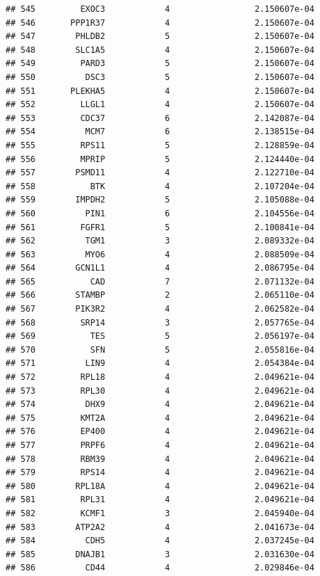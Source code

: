 \documentclass[
]{article}
\begin{document}
\begin{verbatim}
## 545         EXOC3            4                 2.150607e-04
## 546       PPP1R37            4                 2.150607e-04
## 547        PHLDB2            5                 2.150607e-04
## 548        SLC1A5            4                 2.150607e-04
## 549         PARD3            5                 2.150607e-04
## 550          DSC3            5                 2.150607e-04
## 551       PLEKHA5            4                 2.150607e-04
## 552         LLGL1            4                 2.150607e-04
## 553         CDC37            6                 2.142087e-04
## 554          MCM7            6                 2.138515e-04
## 555         RPS11            5                 2.128859e-04
## 556         MPRIP            5                 2.124440e-04
## 557        PSMD11            4                 2.122710e-04
## 558           BTK            4                 2.107204e-04
## 559        IMPDH2            5                 2.105088e-04
## 560          PIN1            6                 2.104556e-04
## 561         FGFR1            5                 2.100841e-04
## 562          TGM1            3                 2.089332e-04
## 563          MYO6            4                 2.088509e-04
## 564        GCN1L1            4                 2.086795e-04
## 565           CAD            7                 2.071132e-04
## 566        STAMBP            2                 2.065110e-04
## 567        PIK3R2            4                 2.062582e-04
## 568         SRP14            3                 2.057765e-04
## 569           TES            5                 2.056197e-04
## 570           SFN            5                 2.055816e-04
## 571          LIN9            4                 2.054384e-04
## 572         RPL18            4                 2.049621e-04
## 573         RPL30            4                 2.049621e-04
## 574          DHX9            4                 2.049621e-04
## 575         KMT2A            4                 2.049621e-04
## 576         EP400            4                 2.049621e-04
## 577         PRPF6            4                 2.049621e-04
## 578         RBM39            4                 2.049621e-04
## 579         RPS14            4                 2.049621e-04
## 580        RPL18A            4                 2.049621e-04
## 581         RPL31            4                 2.049621e-04
## 582         KCMF1            3                 2.045940e-04
## 583        ATP2A2            4                 2.041673e-04
## 584          CDH5            4                 2.037245e-04
## 585        DNAJB1            3                 2.031630e-04
## 586          CD44            4                 2.029846e-04

\end{verbatim}
\end{document}
